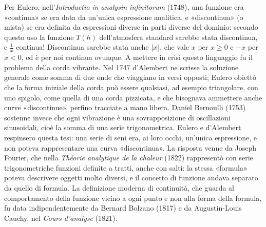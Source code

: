\begin{notastorica}
Per Eulero, nell'\emph{Introductio in analysin infinitorum} (1748), una funzione era
«continua» se era data da un'unica espressione analitica, e «discontinua» (o mista) se
era definita da espressioni diverse in parti diverse del dominio: secondo questo uso la
funzione $T(h)$ dell'atmosfera standard sarebbe stata discontinua, e $\frac1x$
continua! Discontinua sarebbe stata anche $\lvert x\rvert$, che vale $x$ per $x\ge0$ e $-x$ per
$x<0$, ed è per noi continua ovunque. A mettere in crisi questo linguaggio fu il problema
della corda vibrante. Nel 1747 d'Alembert ne scrisse la soluzione generale come somma di
due onde che viaggiano in versi opposti; Eulero obiettò che la forma iniziale della
corda può essere qualsiasi, ad esempio triangolare, con uno spigolo, come quella di una
corda pizzicata, e che bisognava ammettere anche curve «discontinue», perfino tracciate a
mano libera. Daniel Bernoulli (1753) sostenne invece che ogni vibrazione è una
sovrapposizione di oscillazioni sinusoidali, cioè la somma di una serie trigonometrica.
Eulero e d'Alembert respinsero questa tesi: una serie di seni era, ai loro occhi, un'unica
espressione, e non poteva rappresentare una curva «discontinua». La risposta venne da
Joseph Fourier, che nella \emph{Théorie analytique de la chaleur} (1822) rappresentò con
serie trigonometriche funzioni definite a tratti, anche con salti: la stessa «formula»
poteva descrivere oggetti molto diversi, e il concetto di funzione andava separato da
quello di formula. La definizione moderna di continuità, che guarda al comportamento della
funzione vicino a ogni punto e non alla forma della formula, fu data indipendentemente da
Bernard Bolzano (1817) e da Augustin-Louis Cauchy, nel \emph{Cours d'analyse} (1821).
\end{notastorica}
